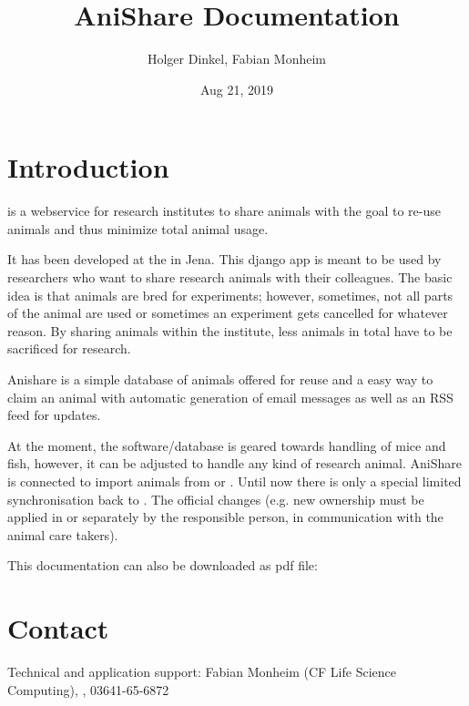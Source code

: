 \documentclass[letterpaper,10pt,openany,oneside,english]{sphinxmanual}
\title{AniShare Documentation}
\date{Aug 21, 2019}
\author{Holger Dinkel, Fabian Monheim}
\begin{document}
\maketitle
\sphinxtableofcontents
{}\label{\detokenize{index::doc}}



\chapter{Introduction}
\label{\detokenize{index:introduction}}
 is a webservice for research institutes to share animals with the goal to re-use
animals and thus minimize total animal usage.

It has been developed at the  in
Jena. This django app is meant to be used by researchers who want to share research animals with
their colleagues. The basic idea is that animals are bred for experiments; however, sometimes, not
all parts of the animal are used or sometimes an experiment gets cancelled for whatever reason. By
sharing animals within the institute, less animals in total have to be sacrificed for research.

Anishare is a simple database of animals offered for reuse and a easy way to claim an animal with
automatic generation of email messages as well as an RSS feed for updates.

\noindent{}

At the moment, the software/database is geared towards handling of mice and fish, however, it can be adjusted
to handle any kind of research animal. AniShare is connected to import animals from  or . Until now there is only a special limited synchronisation back to .
The official changes (e.g. new ownership must be applied in  or  separately by the responsible person, in communication with the animal care takers).

This documentation can also be downloaded as pdf file: 


\chapter{Contact}
\label{\detokenize{index:contact}}
Technical and application support: Fabian Monheim (CF Life Science Computing), , 03641-65-6872
\end{document}
